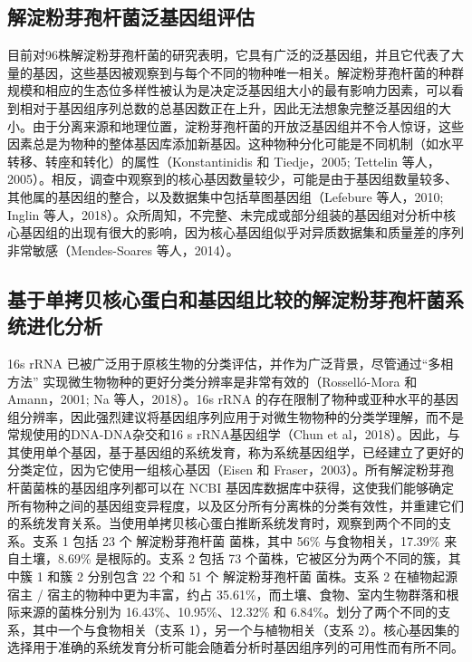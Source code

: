 \documentclass[UTF8]{ctexart}
\begin{document}
\subsection{解淀粉芽孢杆菌泛基因组评估}
目前对96株解淀粉芽孢杆菌的研究表明，它具有广泛的泛基因组，并且它代表了大量的基因，这些基因被观察到与每个不同的物种唯一相关。解淀粉芽孢杆菌的种群规模和相应的生态位多样性被认为是决定泛基因组大小的最有影响力因素，可以看到相对于基因组序列总数的总基因数正在上升，因此无法想象完整泛基因组的大小。由于分离来源和地理位置，淀粉芽孢杆菌的开放泛基因组并不令人惊讶，这些因素总是为物种的整体基因库添加新基因。这种物种分化可能是不同机制（如水平转移、转座和转化）的属性（Konstantinidis 和 Tiedje，2005; Tettelin 等人，2005）。相反，调查中观察到的核心基因数量较少，可能是由于基因组数量较多、其他属的基因组的整合，以及数据集中包括草图基因组（Lefebure 等人，2010; Inglin 等人，2018）。众所周知，不完整、未完成或部分组装的基因组对分析中核心基因组的出现有很大的影响，因为核心基因组似乎对异质数据集和质量差的序列非常敏感（Mendes-Soares 等人，2014）。

\subsection{基于单拷贝核心蛋白和基因组比较的解淀粉芽孢杆菌系统进化分析}

16s rRNA 已被广泛用于原核生物的分类评估，并作为广泛背景，尽管通过``多相方法'' 实现微生物物种的更好分类分辨率是非常有效的（Rosselló-Mora 和 Amann，2001; Na 等人，2018）。16s rRNA 的存在限制了物种或亚种水平的基因组分辨率，因此强烈建议将基因组序列应用于对微生物物种的分类学理解，而不是常规使用的DNA-DNA杂交和16 s rRNA基因组学（Chun et al，2018）。因此，与其使用单个基因，基于基因组的系统发育，称为系统基因组学，已经建立了更好的分类定位，因为它使用一组核心基因（Eisen 和 Fraser，2003）。所有解淀粉芽孢杆菌菌株的基因组序列都可以在 NCBI 基因库数据库中获得，这使我们能够确定所有物种之间的基因组变异程度，以及区分所有分离株的分类有效性，并重建它们的系统发育关系。当使用单拷贝核心蛋白推断系统发育时，观察到两个不同的支系。支系 1 包括 23 个 解淀粉芽孢杆菌 菌株，其中 56\% 与食物相关，17.39\% 来自土壤，8.69\% 是根际的。支系 2 包括 73 个菌株，它被区分为两个不同的簇，其中簇 1 和簇 2 分别包含 22 个和 51 个 解淀粉芽孢杆菌 菌株。支系 2 在植物起源宿主 / 宿主的物种中更为丰富，约占 35.61\%，而土壤、食物、室内生物群落和根际来源的菌株分别为 16.43\%、10.95\%、12.32\% 和 6.84\%。划分了两个不同的支系，其中一个与食物相关（支系 1），另一个与植物相关（支系 2）。核心基因集的选择用于准确的系统发育分析可能会随着分析时基因组序列的可用性而有所不同。
\end{document}
